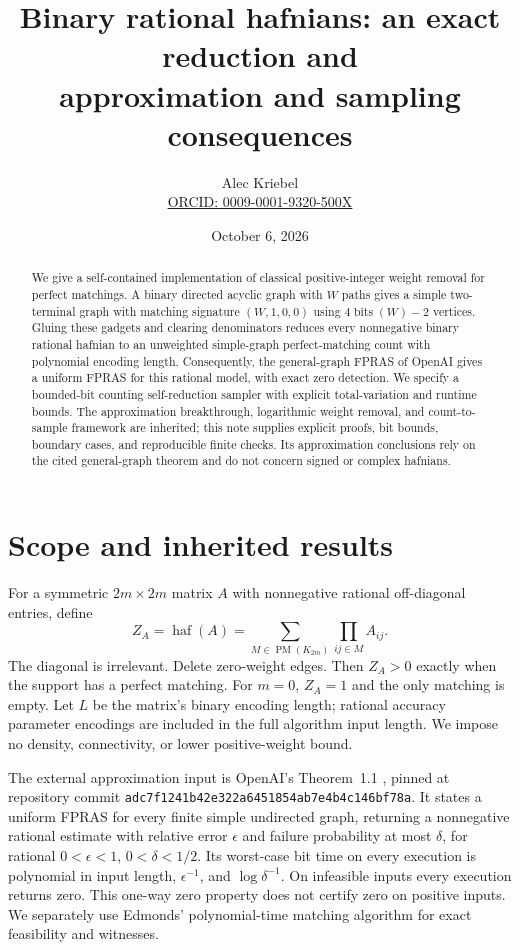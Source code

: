 \documentclass[11pt]{article}
\title{Binary rational hafnians: an exact reduction and\\approximation and sampling consequences}
\author{Alec Kriebel\\\small\href{https://orcid.org/0009-0001-9320-500X}{ORCID: 0009-0001-9320-500X}}
\date{October 6, 2026}
\newcommand{\haf}{\operatorname{haf}}
\newcommand{\PM}{\operatorname{PM}}
\newcommand{\bits}{\operatorname{bits}}
\begin{document}
\maketitle
\begin{abstract}
We give a self-contained implementation of classical positive-integer weight removal for perfect matchings. A binary directed acyclic graph with $W$ paths gives a simple two-terminal graph with matching signature $(W,1,0,0)$ using $4\bits(W)-2$ vertices. Gluing these gadgets and clearing denominators reduces every nonnegative binary rational hafnian to an unweighted simple-graph perfect-matching count with polynomial encoding length. Consequently, the general-graph FPRAS of OpenAI gives a uniform FPRAS for this rational model, with exact zero detection. We specify a bounded-bit counting self-reduction sampler with explicit total-variation and runtime bounds. The approximation breakthrough, logarithmic weight removal, and count-to-sample framework are inherited; this note supplies explicit proofs, bit bounds, boundary cases, and reproducible finite checks. Its approximation conclusions rely on the cited general-graph theorem and do not concern signed or complex hafnians.
\end{abstract}

\section{Scope and inherited results}
For a symmetric $2m\times2m$ matrix $A$ with nonnegative rational off-diagonal entries, define
\[
 Z_A=\haf(A)=\sum_{M\in\PM(K_{2m})}\prod_{ij\in M}A_{ij}.
\]
The diagonal is irrelevant. Delete zero-weight edges. Then $Z_A>0$ exactly when the support has a perfect matching. For $m=0$, $Z_A=1$ and the only matching is empty. Let $L$ be the matrix's binary encoding length; rational accuracy parameter encodings are included in the full algorithm input length. We impose no density, connectivity, or lower positive-weight bound.

The external approximation input is OpenAI's Theorem~1.1 \cite{OAI}, pinned at repository commit \texttt{adc7f1241b42e322a6451854ab7e4b4c146bf78a}. It states a uniform FPRAS for every finite simple undirected graph, returning a nonnegative rational estimate with relative error $\epsilon$ and failure probability at most $\delta$, for rational $0<\epsilon<1$, $0<\delta<1/2$. Its worst-case bit time on every execution is polynomial in input length, $\epsilon^{-1}$, and $\log\delta^{-1}$. On infeasible inputs every execution returns zero. This one-way zero property does not certify zero on positive inputs. We separately use Edmonds' polynomial-time matching algorithm \cite{Edmonds} for exact feasibility and witnesses.
\end{document}
